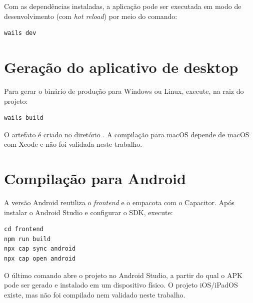 Com as dependências instaladas, a aplicação pode ser executada em modo de
desenvolvimento (com \textit{hot reload}) por meio do comando:

\begin{verbatim}
wails dev
\end{verbatim}

\section{Geração do aplicativo de desktop}
\label{ap:instalacao-build}

Para gerar o binário de produção para Windows ou Linux, execute, na raiz do
projeto:

\begin{verbatim}
wails build
\end{verbatim}

O artefato é criado no diretório . A compilação para macOS
depende de macOS com Xcode e não foi validada neste trabalho.

\section{Compilação para Android}
\label{ap:instalacao-android}

A versão Android reutiliza o \textit{frontend} e o empacota com o Capacitor.
Após instalar o Android Studio e configurar o SDK, execute:

\begin{verbatim}
cd frontend
npm run build
npx cap sync android
npx cap open android
\end{verbatim}

O último comando abre o projeto no Android Studio, a partir do qual o APK pode
ser gerado e instalado em um dispositivo físico. O projeto iOS/iPadOS existe,
mas não foi compilado nem validado neste trabalho.
